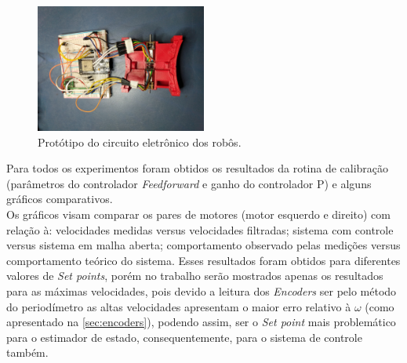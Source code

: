 \begin{figure}[H]
    \centering
    \includegraphics[width=0.5\textwidth]{figuras/robo/protoboard.jpg}
    \caption{Protótipo do circuito eletrônico dos robôs.}
    \label{fig:prototipo}
\end{figure}

Para todos os experimentos foram obtidos os resultados da rotina de calibração (parâmetros do controlador \emph{Feedforward} e ganho do controlador P) e alguns gráficos comparativos. \\

Os gráficos visam comparar os pares de motores (motor esquerdo e direito) com relação à: velocidades medidas versus velocidades filtradas; sistema com controle versus sistema em malha aberta; comportamento observado pelas medições versus comportamento teórico do sistema. Esses resultados foram obtidos para diferentes valores de \emph{Set points}, porém no trabalho serão mostrados apenas os resultados para as máximas velocidades, pois devido a leitura dos \emph{Encoders} ser pelo método do periodímetro as altas velocidades apresentam o maior erro relativo à $\omega$ (como apresentado na \autoref{sec:encoders}), podendo assim, ser o \emph{Set point} mais problemático para o estimador de estado, consequentemente, para o sistema de controle também.\\



